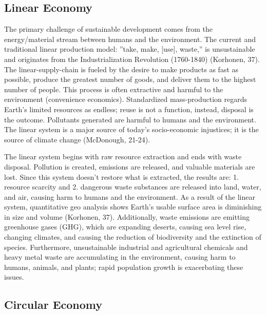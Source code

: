 \subsection{Linear Economy}

The primary challenge of sustainable development comes from the energy/material stream between humans and the environment. The current and traditional linear production model: ''take, make, [use], waste,'' is unsustainable and originates from the Industrialization Revolution (1760-1840) (Korhonen, 37). The linear-supply-chain is fueled by the desire to make products as fast as possible, produce the greatest number of goods, and deliver them to the highest number of people. This process is often extractive and harmful to the environment (convenience economics). Standardized mass-production regards Earth's limited resources as endless; reuse is not a function, instead, disposal is the outcome. Pollutants generated are harmful to humans and the environment. The linear system is a major source of today’s socio-economic injustices; it is the source of climate change (McDonough, 21-24). 

The linear system begins with raw resource extraction and ends with waste disposal. Pollution is created, emissions are released, and valuable materials are lost. Since this system doesn’t restore what is extracted, the results are: 1. resource scarcity and 2. dangerous waste substances are released into land, water, and air, causing harm to humans and the environment. As a result of the linear system, quantitative geo analysis shows Earth’s usable surface area is diminishing in size and volume (Korhonen, 37). Additionally, waste emissions are emitting greenhouse gases (GHG), which are expanding deserts, causing sea level rise, changing climates, and causing the reduction of biodiversity and the extinction of species. Furthermore, unsustainable industrial and agricultural chemicals and heavy metal waste are accumulating in the environment, causing harm to humans, animals, and plants; rapid population growth is exacerbating these issues. 

\subsection{Circular Economy}

